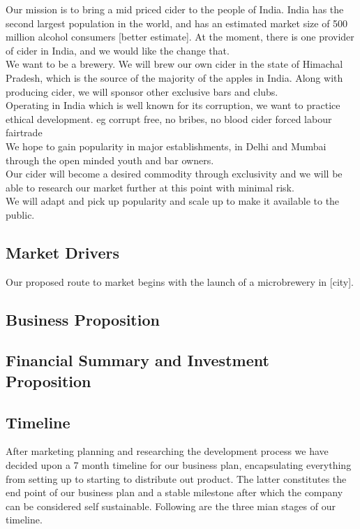 \documentclass[11pt]{article}
\begin{document}
Our mission is to bring a mid priced cider to the people of India. India has the second largest population in the world, and has an estimated market size of 500 million alcohol consumers [better estimate]. At the moment, there is one provider of cider in India, and we would like the change that. \\

\noindent We want to be a brewery. We will brew our own cider in the state of Himachal Pradesh, which is the source of the majority of the apples in India. Along with producing cider, we will sponsor other exclusive bars and clubs. \\

\noindent Operating in India which is well known for its corruption, we want to practice ethical development. eg corrupt free, no bribes, no blood cider forced labour fairtrade \\

\noindent We hope to gain popularity in major establishments, in Delhi and Mumbai through the open minded youth and bar owners. \\

\noindent Our cider will become a desired commodity through exclusivity and we will be able to research our market further at this point with minimal risk. \\

\noindent We will adapt and pick up popularity and scale up to make it available to the public.

  \subsection{Market Drivers}
\noindent Our proposed route to market begins with the launch of a microbrewery in [city].

  \subsection{Business Proposition}
  \subsection{Financial Summary and Investment Proposition}


  \subsection{Timeline}
After marketing planning and researching the development process we have decided upon a 7 month timeline for our business plan, encapsulating everything from setting up to starting to distribute out product. The latter constitutes the end point of our business plan and a stable milestone after which the company can be considered self sustainable. Following are the three mian stages of our timeline.
\end{document}
